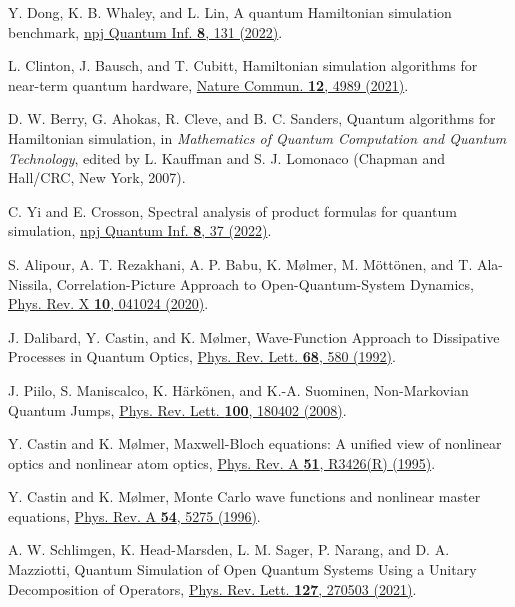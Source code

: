 \documentclass[aps,pra,twocolumn,floatfix,groupedaddress,superscriptaddress,nofootinbib,notitlepage]{revtex4-2}
\begin{document}
\begin{thebibliography}{100}
 Y. Dong, K. B. Whaley, and L. Lin, A quantum Hamiltonian simulation benchmark, \href{https://doi.org/10.1038/s41534-022-00636-x}{npj Quantum Inf. \textbf{8}, 131 (2022)}.

 L. Clinton, J. Bausch, and T. Cubitt, Hamiltonian simulation algorithms for near-term quantum hardware, \href{https://doi.org/10.1038/s41467-021-25196-0}{Nature Commun. \textbf{12}, 4989 (2021)}.

 D. W. Berry, G. Ahokas, R. Cleve, and B. C. Sanders, Quantum algorithms for Hamiltonian simulation, in \emph{Mathematics of Quantum Computation and Quantum Technology}, edited by L. Kauffman and S. J. Lomonaco (Chapman and Hall/CRC, New York, 2007).

 C. Yi and E. Crosson, Spectral analysis of product formulas for quantum simulation, \href{https://doi.org/10.1038/s41534-022-00548-w}{npj Quantum Inf. \textbf{8}, 37 (2022)}.

 S. Alipour, A. T. Rezakhani, A. P. Babu, K. M{\o}lmer, M. M\"{o}tt\"{o}nen, and T. Ala-Nissila, Correlation-Picture Approach to Open-Quantum-System Dynamics, \href{https://doi.org/10.1103/PhysRevX.10.041024}{Phys. Rev. X \textbf{10}, 041024 (2020)}.

 J. Dalibard, Y. Castin, and K. M{\o}lmer, Wave-Function Approach to Dissipative Processes in Quantum Optics, \href{https://doi.org/10.1103/PhysRevLett.68.580}{Phys. Rev. Lett. \textbf{68}, 580 (1992)}.

 J. Piilo, S. Maniscalco, K. H\"{a}rk\"{o}nen, and K.-A. Suominen, Non-Markovian Quantum Jumps, \href{https://doi.org/10.1103/PhysRevLett.100.180402}{Phys. Rev. Lett. \textbf{100}, 180402 (2008)}.

 Y. Castin and K. M{\o}lmer, Maxwell-Bloch equations: A unified view of nonlinear optics and nonlinear atom optics, \href{https://doi.org/10.1103/PhysRevA.51.R3426}{Phys. Rev. A \textbf{51}, R3426(R) (1995)}.

 Y. Castin and K. M{\o}lmer, Monte Carlo wave functions and nonlinear master equations, \href{https://doi.org/10.1103/PhysRevA.54.5275}{Phys. Rev. A \textbf{54}, 5275 (1996)}.

 A. W. Schlimgen, K. Head-Marsden, L. M. Sager, P. Narang, and D. A. Mazziotti, Quantum Simulation of Open Quantum Systems Using a Unitary Decomposition of Operators, \href{https://doi.org/10.1103/PhysRevLett.127.270503}{Phys. Rev. Lett. \textbf{127}, 270503 (2021)}.


\end{thebibliography}
\end{document}
